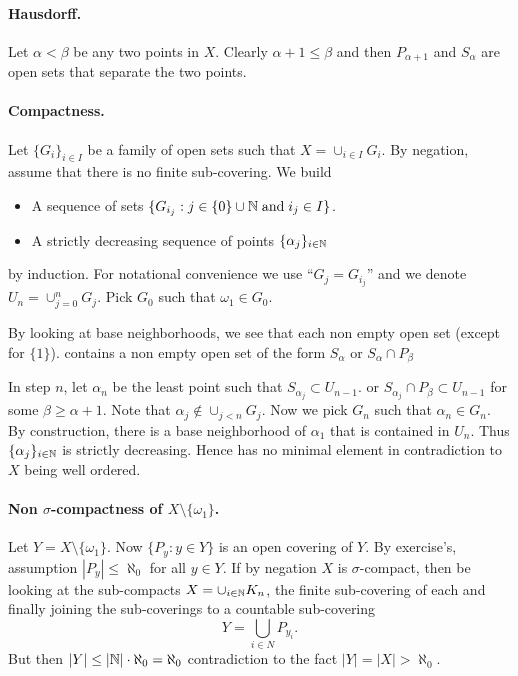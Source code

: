 \begin{enumerate}
\paragraph{Hausdorff.} Let \(\alpha<\beta\) be any two points in $X$.
Clearly \(\alpha+1\leq \beta\) and then  \(P_{\alpha+1}\) and \(S_{\alpha}\)
are open sets that separate the two points.

\paragraph{Compactness.} Let \(\{G_i\}_{i\in I}\) be a family of open
sets such that \(X=\cup_{i\in I}G_i\). By negation, assume that
there is no finite sub-covering. We build
\begin{itemize}
\item A sequence of sets
     \(\{G_{i_j}: j\in\{0\}\cup \mathbb{N}\;\textrm{and}\; i_j \in I\}\).
\item A strictly decreasing sequence of points \(\{\alpha_j\}_{i\in\mathbb{N}}\)
\end{itemize}
by induction.
For notational convenience we use ``\(G_j=G_{i_j}\)''
and we denote \(U_n = \cup_{j=0}^n G_j\).
Pick \(G_0\) such that \(\omega_1\in G_0\).

By looking at base neighborhoods, we see that
each non empty open set (except for \(\{1\}\)).
contains a
non empty open set of the form \(S_\alpha\) or \(S_\alpha \cap P_\beta\)

In step $n$, let \(\alpha_n\) be the least point such that
\(S_{\alpha_j} \subset U_{n-1}\).
or \(S_{\alpha_j}\cap P_\beta \subset U_{n-1}\) for some
\(\beta \geq \alpha+1\).
Note that \(\alpha_j \notin \cup_{j<n} G_j\). Now we pick \(G_n\) such that
\(\alpha_n \in G_n\).
By construction, there is a base neighborhood of \(\alpha_1\)
that is contained in \(U_n\). Thus \(\{\alpha_j\}_{i\in\mathbb{N}}\) is strictly
decreasing. Hence has no minimal element in contradiction to $X$ being
well ordered.


\paragraph{Non \(\sigma\)-compactness of \(X\setminus\{\omega_1\}\).}
Let \(Y= X\setminus\{\omega_1\}\). Now
\(\{P_y: y\in Y\}\) is an open covering of $Y$.
By exercise's, assumption \(|P_y| \leq \aleph_0\) for all \(y\in Y\).
If by negation $X$ is \(\sigma\)-compact, then be looking at the sub-compacts
\(X=\cup_{i\in\mathbb{N}} K_n\), the finite sub-covering of each and finally
joining the sub-coverings to a countable sub-covering
\begin{equation*}
 Y = \bigcup_{i\in N} P_{y_i}.
\end{equation*}
But then \(|Y| \leq |\mathbb{N}|\cdot\aleph_0 = \aleph_0\)
contradiction to the fact \(|Y|=|X|>\aleph_0\).


\end{enumerate}
